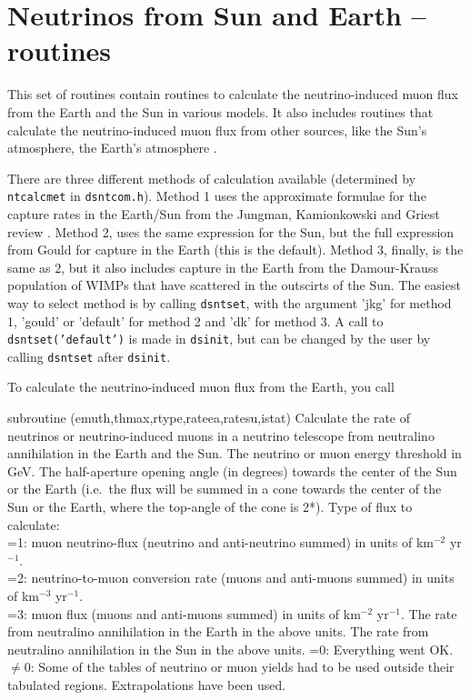 \section{Neutrinos from Sun and Earth --  routines}


This set of routines contain routines to calculate the
neutrino-induced muon flux from the Earth and the Sun in various
models. It also includes routines that calculate the neutrino-induced
muon flux from other sources, like the Sun's atmosphere, the Earth's
atmosphere .

There are three different methods of calculation available (determined
by \texttt{ntcalcmet} in \texttt{dsntcom.h}). Method 1 uses the
approximate formulae for the capture rates in the Earth/Sun from the
Jungman, Kamionkowski and Griest review \cite{jkg}. Method 2, uses the
same expression for the Sun, but the full expression from Gould
\cite{Gould321} for capture in the Earth (this is the default). Method
3, finally, is the same as 2, but it also includes capture in the
Earth from the Damour-Krauss population of WIMPs that have scattered
in the outscirts of the Sun. The easiest way to select method is by
calling \texttt{dsntset}, with the argument 'jkg' for method 1, 'gould'
or 'default' for method 2 and 'dk' for method 3. A call to 
\texttt{dsntset('default')} is made in \texttt{dsinit}, but can be
changed by the user by calling \texttt{dsntset} after \texttt{dsinit}.

To calculate the neutrino-induced muon flux from the Earth, you call

\begin{sub}{subroutine
(emuth,thmax,rtype,rateea,ratesu,istat)}
   Calculate the rate of neutrinos or neutrino-induced
  muons in a neutrino telescope from neutralino annihilation in the
  Earth and the Sun.
   The neutrino or muon energy threshold in GeV.
   The half-aperture opening angle (in degrees) 
  towards the center
  of the Sun or the Earth (i.e.\ the flux will be summed in a cone
  towards the center of the Sun or the Earth, where the top-angle of
  the cone is 2*).
  Type of flux to calculate:\\
  =1: muon neutrino-flux (neutrino and anti-neutrino summed) in units
  of km$^{-2}$ yr$^{-1}$.\\
  =2: neutrino-to-muon conversion rate (muons and anti-muons summed)
  in units of km$^{-3}$ yr$^{-1}$.\\
  =3: muon flux (muons and anti-muons summed)
  in units of km$^{-2}$ yr$^{-1}$.
   The rate from neutralino annihilation in the Earth
  in the above units.
   The rate from neutralino annihilation in the Sun
  in the above units.
   =0: Everything went OK.\\
  $\neq0$: Some of the tables of neutrino or muon yields had to be
  used outside their tabulated regions. Extrapolations have been used.
\end{sub}

